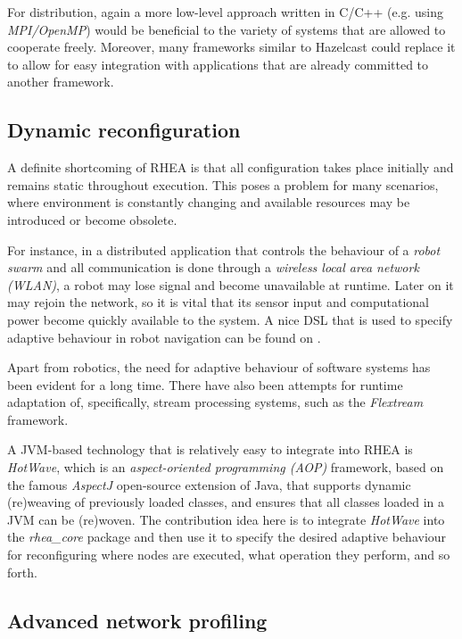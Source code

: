 \documentclass[sigplan,review,anonymous]{acmart}
\begin{document}
For distribution, again a more low-level approach written in C/C++ (e.g. using
\textit{MPI/OpenMP}) would be beneficial to the variety of systems that are
allowed to cooperate freely. Moreover, many frameworks similar to Hazelcast
could replace it to allow for easy integration with applications that are
already committed to another framework.

\subsection{Dynamic reconfiguration}

A definite shortcoming of \textsc{RHEA} is that all configuration takes place
initially and remains static throughout execution. This poses a problem for many
scenarios, where environment is constantly changing and available resources may
be introduced or become obsolete.

For instance, in a distributed application that controls the behaviour of a
\textit{robot swarm} and all communication is done through a \textit{wireless
local area network (WLAN)}, a robot may lose signal and become unavailable at
runtime. Later on it may rejoin the network, so it is vital that its sensor
input and computational power become quickly available to the system. A nice DSL
that is used to specify adaptive behaviour in robot navigation can be found on
\cite{reconf_robot}.

Apart from robotics, the need for adaptive behaviour of software systems has
been evident for a long time\cite{reconf_survey}. There have also been attempts
for runtime adaptation of, specifically, stream processing systems, such as the
\textit{Flextream} framework\cite{flextream}.

A JVM-based technology that is relatively easy to integrate into \textsc{RHEA}
is \textit{HotWave}\cite{reconf_java}, which is an \textit{aspect-oriented
programming (AOP)} framework, based on the famous
\textit{AspectJ} open-source extension of
Java, that supports dynamic (re)weaving of previously loaded classes, and
ensures that all classes loaded in a JVM can be (re)woven. The contribution idea
here is to integrate \textit{HotWave} into the \textit{rhea\_core} package and
then use it to specify the desired adaptive behaviour for reconfiguring where
nodes are executed, what operation they perform, and so forth.

\subsection{Advanced network profiling}
\end{document}
